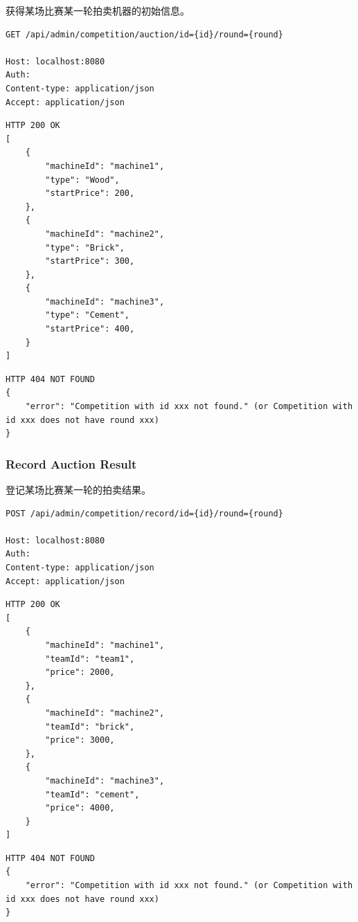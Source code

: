 \documentclass[12pt, a4paper,UTF8]{article}
\begin{document}
获得某场比赛某一轮拍卖机器的初始信息。

\begin{lstlisting}
GET /api/admin/competition/auction/id={id}/round={round}

Host: localhost:8080
Auth:
Content-type: application/json
Accept: application/json
\end{lstlisting}

\begin{lstlisting}
HTTP 200 OK
[
    {
        "machineId": "machine1",
        "type": "Wood",
        "startPrice": 200,
    },
    {
        "machineId": "machine2",
        "type": "Brick",
        "startPrice": 300,
    },
    {
        "machineId": "machine3",
        "type": "Cement",
        "startPrice": 400,
    }
]
\end{lstlisting}

\begin{lstlisting}
HTTP 404 NOT FOUND
{
    "error": "Competition with id xxx not found." (or Competition with id xxx does not have round xxx)
}
\end{lstlisting}

\subsubsection{Record Auction Result}

登记某场比赛某一轮的拍卖结果。

\begin{lstlisting}
POST /api/admin/competition/record/id={id}/round={round}

Host: localhost:8080
Auth:
Content-type: application/json
Accept: application/json
\end{lstlisting}

\begin{lstlisting}
HTTP 200 OK
[
    {
        "machineId": "machine1",
        "teamId": "team1",
        "price": 2000,
    },
    {
        "machineId": "machine2",
        "teamId": "brick",
        "price": 3000,
    },
    {
        "machineId": "machine3",
        "teamId": "cement",
        "price": 4000,
    }
]
\end{lstlisting}

\begin{lstlisting}
HTTP 404 NOT FOUND
{
    "error": "Competition with id xxx not found." (or Competition with id xxx does not have round xxx)
}
\end{lstlisting}
\end{document}
